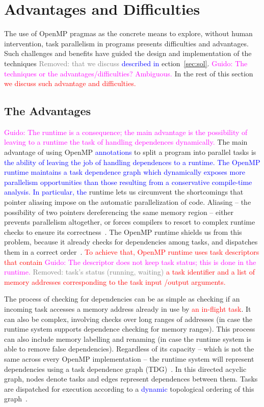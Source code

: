 \documentclass[sigplan,10pt,review,anonymous]{acmart}
\newcommand{\guido}[1]{\noindent\textcolor{magenta}{Guido: {#1}}}
\newcommand{\rmv}[1]{\noindent\textcolor{gray}{Removed: {#1}}}
\newcommand{\new}[1]{\noindent\textcolor{blue}{ {#1}}}
\newcommand{\ed}[1]{\noindent\textcolor{red}{ {#1}}}
\newcommand{\guido}[1]{}
\newcommand{\rmv}[1]{}
\newcommand{\new}[1]{#1}
\newcommand{\ed}[1]{}
\begin{document}
\section{Advantages and Difficulties}
\label{sec:ovf}

The use of OpenMP pragmas as the concrete means to explore, without human
intervention, task parallelism in programs presents difficulties and
advantages. 
Such challenges and benefits have guided the design and implementation of the
techniques \rmv{that we discuss} \new{described in} ection~\ref{sec:sol}.
\guido{The techniques or the advantages/difficulties? Ambiguous.} 
In the rest of this section \ed{we discuss such advantage and difficulties.}

\subsection{The Advantages}
\label{sub:adv}

\guido{The runtime is a consequence; the main advantage is the possibility of leaving to a
runtime the task of handling dependences dynamically.} 
The main advantage of using OpenMP \new{annotations} to split a program into parallel tasks is
\new{the ability  of leaving the job of  handling dependences to a runtime.}
\new{The OpenMP runtime maintains a task dependence graph which dynamically exposes more parallelism 
opportunities than those resulting from a conservative  compile-time  analysis.}
\new{In particular, the} runtime lets us circumvent the shortcomings that pointer aliasing
impose on the automatic parallelization of code.
Aliasing -- the possibility of two pointers dereferencing the same
memory region -- either prevents parallelism altogether, or forces compilers to
resort to complex runtime checks to ensure its correctness~\cite{Alves15,Rus02}.
The OpenMP runtime shields us from this problem, because
it already checks for dependencies among tasks, and dispatches them in a
correct order~\cite{LaGrone11}. \ed{To achieve that, OpenMP runtime uses task descriptors that contain}
\guido{The descriptor does not keep task status; this is done in the runtime.}
\rmv{task's status (running, waiting)} \ed{a task identifier and  a list of memory addresses corresponding to the task input /output arguments.}

The process of checking for dependencies can be as simple as checking if an
incoming task accesses a memory address already in use by \ed{an in-flight task}.
It can also be complex, involving checks over long ranges of addresses
(in case the runtime system supports dependence checking for memory ranges).
This process can also include memory labelling and renaming (in case the
runtime system is able to remove false dependencies).
Regardless of its capacity -- which is not the same across every OpenMP
implementation -- the runtime system will represent dependencies using a task
dependence graph (TDG)~\cite{Duran08}.
In this directed acyclic graph, nodes denote tasks and edges represent
dependences between them.
Tasks are dispatched for execution according to a \new{dynamic} topological ordering of this
graph~\cite{Planas15}.
\end{document}

